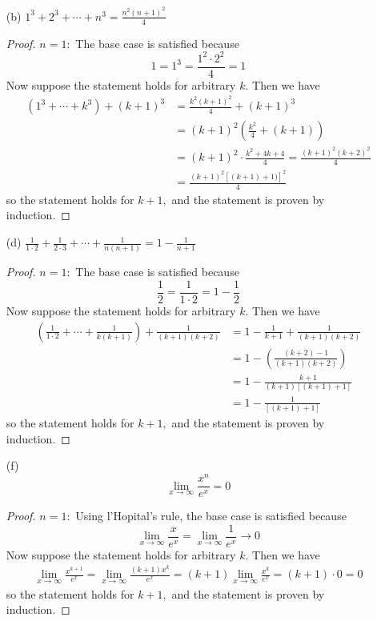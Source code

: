 \documentclass{article}
\begin{document}
\begin{itemize}
\begin{itemize}
				\newpage
			\item[(b)] $1^3+2^3+\cdots+n^3=\frac{n^2(n+1)^2}{4}$
				\begin{proof}
					$n=1:$ The base case is satisfied because
					\[1=1^3=\frac{1^2\cdot 2^2}{4}=1\]
					Now suppose the statement holds for arbitrary $k.$ Then we have
					\begin{align*}
						(1^3+\cdots+k^3) + (k+1)^3 &= \frac{k^2(k+1)^2}{4} + (k+1)^3 \\
						&= (k+1)^2\left( \frac{k^2}{4} + (k+1) \right) \\
						&= (k+1)^2\cdot \frac{k^2+4k+4}{4} = \frac{(k+1)^2(k+2)^2}{4} \\
						&= \frac{(k+1)^2\left[ (k+1)+1) \right]^2}{4}
					\end{align*}
					so the statement holds for $k+1,$ and the statement is proven by induction.
				\end{proof}

			\item[(d)] $\frac{1}{1\cdot2}+\frac{1}{2\cdot 3} + \cdots + \frac{1}{n(n+1)}=1-\frac{1}{n+1}$
				\begin{proof}
					$n=1:$ The base case is satisfied because
					\[\frac{1}{2} = \frac{1}{1\cdot 2} = 1-\frac{1}{2}\]
					Now suppose the statement holds for arbitrary $k.$ Then we have
					\begin{align*}
						\left(\frac{1}{1\cdot 2} + \cdots + \frac{1}{k(k+1)}\right) + \frac{1}{(k+1)(k+2)} &= 1-\frac{1}{k+1} + \frac{1}{(k+1)(k+2)} \\
						&= 1-\left( \frac{(k+2)-1}{(k+1)(k+2)} \right) \\
						&= 1-\frac{k+1}{(k+1)\left[ (k+1)+1 \right]} \\
						&= 1-\frac{1}{\left[ (k+1)+1 \right]}
					\end{align*}
					so the statement holds for $k+1,$ and the statement is proven by induction.
				\end{proof}

			\item[(f)]
				\[\lim_{x\to\infty} \frac{x^n}{e^x}=0\]
				\begin{proof}
					$n=1:$ Using l'Hopital's rule, the base case is satisfied because
					\[\lim_{x\to \infty} \frac{x}{e^x} = \lim_{x\to \infty} \frac{1}{e^x} \to 0\]
					Now suppose the statement holds for arbitrary $k.$ Then we have
					\begin{align*}
						\lim_{x\to\infty} \frac{x^{k+1}}{e^x} = \lim_{x\to\infty}\frac{(k+1)x^k}{e^x} = (k+1)\lim_{x\to\infty} \frac{x^k}{e^x} = (k+1)\cdot 0 = 0
					\end{align*}
					so the statement holds for $k+1,$ and the statement is proven by induction.
				\end{proof}
				

\end{itemize}
\end{itemize}
\end{document}

